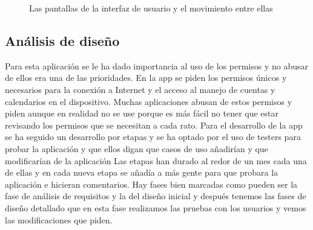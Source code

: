 \begin{figure}[H]
  \caption{Las pantallas de la interfaz de usuario y el movimiento entre ellas}
  \label{fig:activity-relations}
\end{figure}

\subsection{Análisis de diseño}
\label{subsecc:Análisis de diseño}

Para esta aplicación se le ha dado importancia al uso de los permisos y no abusar de ellos era una de las prioridades.
En la app se piden los permisos únicos y necesarios para la conexión a Internet y el acceso al manejo de cuentas y calendarios en el dispositivo.
Muchas aplicaciones abusan de estos permisos y piden aunque en realidad no se use porque es más fácil no tener que estar revisando los permisos que se necesitan a cada rato.
Para el desarrollo de la app se ha seguido un desarrollo por etapas y se ha optado por el uso de testers para probar la aplicación y que ellos digan que casos de uso añadirían y que modificarían de la aplicación
Las etapas han durado al redor de un mes cada una de ellas y en cada nueva etapa se añadía a más gente para que probara la aplicación e hicieran comentarios.
Hay fases bien marcadas como pueden ser la fase de análisis de requisitos y la del diseño inicial y después tenemos las fases de diseño detallado que en esta fase realizamos las pruebas con los usuarios y vemos las modificaciones que piden.


